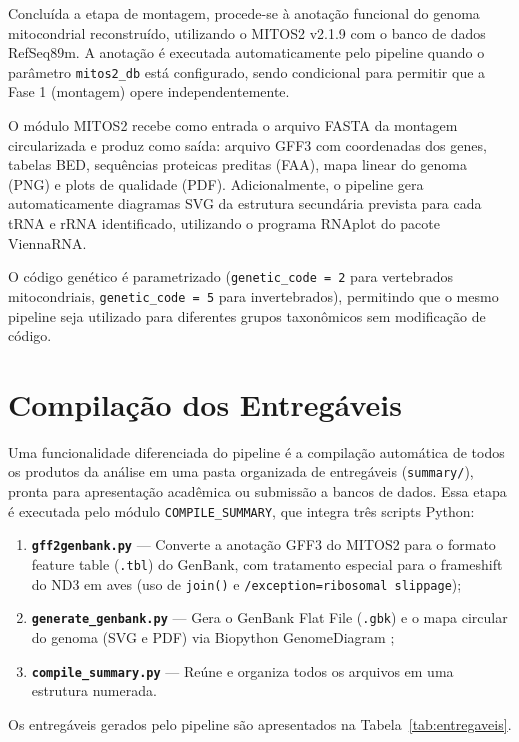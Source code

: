 Concluída a etapa de montagem, procede-se à anotação funcional do genoma mitocondrial reconstruído, utilizando o MITOS2 v2.1.9 com o banco de dados RefSeq89m. A anotação é executada automaticamente pelo pipeline quando o parâmetro \texttt{mitos2\_db} está configurado, sendo condicional para permitir que a Fase 1 (montagem) opere independentemente.

O módulo MITOS2 recebe como entrada o arquivo FASTA da montagem circularizada e produz como saída: arquivo GFF3 com coordenadas dos genes, tabelas BED, sequências proteicas preditas (FAA), mapa linear do genoma (PNG) e plots de qualidade (PDF). Adicionalmente, o pipeline gera automaticamente diagramas SVG da estrutura secundária prevista para cada tRNA e rRNA identificado, utilizando o programa RNAplot do pacote ViennaRNA.

O código genético é parametrizado (\texttt{genetic\_code = 2} para vertebrados mitocondriais, \texttt{genetic\_code = 5} para invertebrados), permitindo que o mesmo pipeline seja utilizado para diferentes grupos taxonômicos sem modificação de código.

\section{Compilação dos Entregáveis}

Uma funcionalidade diferenciada do pipeline é a compilação automática de todos os produtos da análise em uma pasta organizada de entregáveis (\texttt{summary/}), pronta para apresentação acadêmica ou submissão a bancos de dados. Essa etapa é executada pelo módulo \texttt{COMPILE\_SUMMARY}, que integra três scripts Python:

\begin{enumerate}
    \item \textbf{\texttt{gff2genbank.py}} --- Converte a anotação GFF3 do MITOS2 para o formato feature table (\texttt{.tbl}) do GenBank, com tratamento especial para o frameshift do ND3 em aves (uso de \texttt{join()} e \texttt{/exception=ribosomal slippage});
    \item \textbf{\texttt{generate\_genbank.py}} --- Gera o GenBank Flat File (\texttt{.gbk}) e o mapa circular do genoma (SVG e PDF) via Biopython GenomeDiagram \cite{cock2009};
    \item \textbf{\texttt{compile\_summary.py}} --- Reúne e organiza todos os arquivos em uma estrutura numerada.
\end{enumerate}

Os entregáveis gerados pelo pipeline são apresentados na Tabela~\ref{tab:entregaveis}.

